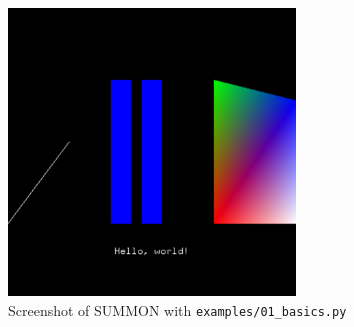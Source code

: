 \documentclass[12pt]{article}
\newcommand{\code}[1]{{\tt #1}}
\begin{document}
\begin{figure}
\begin{center}
\includegraphics[height=3in]{figures/01_basics.pdf}
\end{center}
\caption{Screenshot of SUMMON with \code{examples/01\_basics.py}}
\label{fig:01_basics}
\end{figure}
\end{document}
